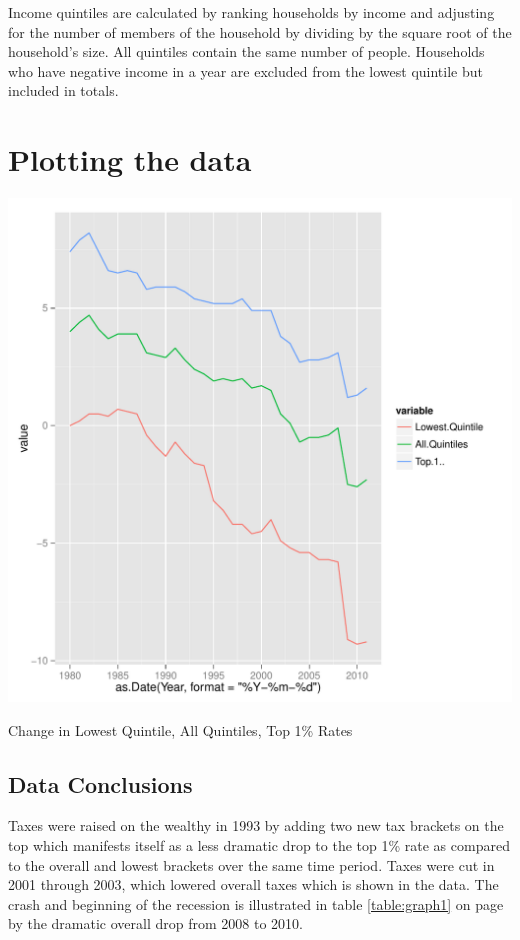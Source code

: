 \documentclass{article}\usepackage[]{graphicx}\usepackage[]{color}
\makeatletter
\def\maxwidth{ %
  \ifdim\Gin@nat@width>\linewidth
    \linewidth
  \else
    \Gin@nat@width
  \fi
}
\newenvironment{knitrout}{}{} %
\makeatother
\begin{document}
Income quintiles are calculated by ranking households by income and adjusting for the number of members of the household by dividing by the square root of the household’s size. All quintiles contain the same number of people. Households who have negative income in a year are excluded from the lowest quintile but included in totals.

\section{Plotting the data}

\begin{table}
\begin{knitrout}
\color{fgcolor}
\includegraphics[width=\maxwidth]{figure/unnamed-chunk-6-1} 

\end{knitrout}
\caption{Change in Lowest Quintile, All Quintiles, Top 1\% Rates}
\label{table:graph1}
\end{table}

\subsection{Data Conclusions}

Taxes were raised on the wealthy in 1993 by adding two new tax brackets on the top which manifests itself as a less dramatic drop to the top 1\% rate as compared to the overall and lowest brackets over the same time period. Taxes were cut in 2001 through 2003, which lowered overall taxes which is shown in the data. The crash and beginning of the recession is illustrated in table \ref{table:graph1} on page \pageref{table:graph1} by the dramatic overall drop from 2008 to 2010.
\end{document}
